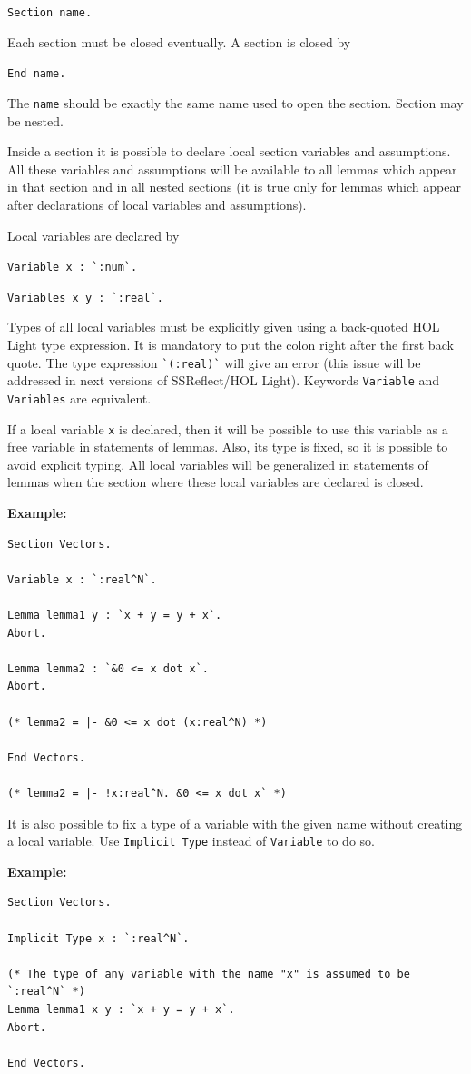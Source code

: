 \documentclass[a4paper]{article}
\begin{document}
\verb|Section name.|

Each section must be closed eventually. A section is closed by 

\verb|End name.| 

The {\tt name} should be exactly the same name used to open the section. Section may be nested.

Inside a section it is possible to declare local section variables and assumptions. All these variables and assumptions will be available to all lemmas which appear in that section and in all nested sections (it is true only for lemmas which appear after declarations of local variables and assumptions).

Local variables are declared by

\verb|Variable x : `:num`.|

\verb|Variables x y : `:real`.|

Types of all local variables must be explicitly given using a back-quoted HOL Light type expression. It is mandatory to put the colon right after the first back quote. The type expression \verb|`(:real)`| will give an error (this issue will be addressed in next versions of SSReflect/HOL Light). Keywords \verb|Variable| and \verb|Variables| are equivalent.

If a local variable \verb|x| is declared, then it will be possible to use this variable as a free variable in statements of lemmas. Also, its type is fixed, so it is possible to avoid explicit typing. All local variables will be generalized in statements of lemmas when the section where these local variables are declared is closed. 

{\bf Example:}
\begin{verbatim}
Section Vectors.

Variable x : `:real^N`.

Lemma lemma1 y : `x + y = y + x`.
Abort.

Lemma lemma2 : `&0 <= x dot x`.
Abort.

(* lemma2 = |- &0 <= x dot (x:real^N) *)

End Vectors.

(* lemma2 = |- !x:real^N. &0 <= x dot x` *)
\end{verbatim}

It is also possible to fix a type of a variable with the given name without creating a local variable. Use \verb|Implicit Type| instead of \verb|Variable| to do so. 

{\bf Example:}
\begin{verbatim}
Section Vectors.

Implicit Type x : `:real^N`.

(* The type of any variable with the name "x" is assumed to be `:real^N` *)
Lemma lemma1 x y : `x + y = y + x`.
Abort.

End Vectors.
\end{verbatim}
\end{document}
